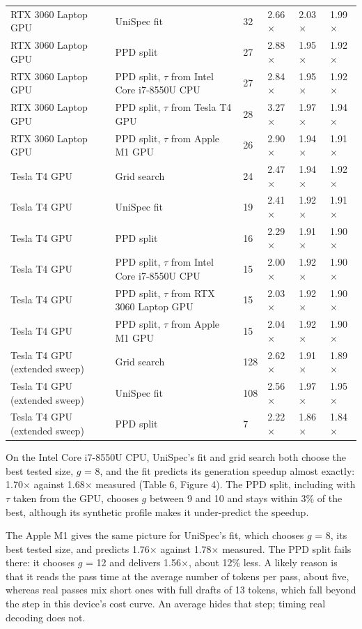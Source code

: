 \documentclass[11pt,a4paper]{article}
\begin{document}
\begin{table}[tbp]
\begin{tabular}{L{3.29cm}L{5.13cm}L{0.92cm}L{1.65cm}L{1.65cm}L{1.83cm}}
RTX 3060 Laptop GPU & UniSpec fit & 32 & 2.66$\times$ & 2.03$\times$ & 1.99$\times$ \\
RTX 3060 Laptop GPU & PPD split & 27 & 2.88$\times$ & 1.95$\times$ & 1.92$\times$ \\
RTX 3060 Laptop GPU & PPD split, $\tau$ from Intel Core i7-8550U CPU & 27 & 2.84$\times$ & 1.95$\times$ & 1.92$\times$ \\
RTX 3060 Laptop GPU & PPD split, $\tau$ from Tesla T4 GPU & 28 & 3.27$\times$ & 1.97$\times$ & 1.94$\times$ \\
RTX 3060 Laptop GPU & PPD split, $\tau$ from Apple M1 GPU & 26 & 2.90$\times$ & 1.94$\times$ & 1.91$\times$ \\
Tesla T4 GPU & Grid search & 24 & 2.47$\times$ & 1.94$\times$ & 1.92$\times$ \\
Tesla T4 GPU & UniSpec fit & 19 & 2.41$\times$ & 1.92$\times$ & 1.91$\times$ \\
Tesla T4 GPU & PPD split & 16 & 2.29$\times$ & 1.91$\times$ & 1.90$\times$ \\
Tesla T4 GPU & PPD split, $\tau$ from Intel Core i7-8550U CPU & 15 & 2.00$\times$ & 1.92$\times$ & 1.90$\times$ \\
Tesla T4 GPU & PPD split, $\tau$ from RTX 3060 Laptop GPU & 15 & 2.03$\times$ & 1.92$\times$ & 1.90$\times$ \\
Tesla T4 GPU & PPD split, $\tau$ from Apple M1 GPU & 15 & 2.04$\times$ & 1.92$\times$ & 1.90$\times$ \\
Tesla T4 GPU (extended sweep) & Grid search & 128 & 2.62$\times$ & 1.91$\times$ & 1.89$\times$ \\
Tesla T4 GPU (extended sweep) & UniSpec fit & 108 & 2.56$\times$ & 1.97$\times$ & 1.95$\times$ \\
Tesla T4 GPU (extended sweep) & PPD split & 7 & 2.22$\times$ & 1.86$\times$ & 1.84$\times$ \\
\bottomrule
\end{tabular}
\end{table}
On the Intel Core i7-8550U CPU, UniSpec's fit and grid search both choose the best tested size, $g$ = 8, and the fit predicts its generation speedup almost exactly: 1.70$\times$ against 1.68$\times$ measured (Table 6, Figure 4). The PPD split, including with $\tau$ taken from the GPU, chooses $g$ between 9 and 10 and stays within 3\% of the best, although its synthetic profile makes it under-predict the speedup.

The Apple M1 gives the same picture for UniSpec's fit, which chooses $g$ = 8, its best tested size, and predicts 1.76$\times$ against 1.78$\times$ measured. The PPD split fails there: it chooses $g$ = 12 and delivers 1.56$\times$, about 12\% less. A likely reason is that it reads the pass time at the average number of tokens per pass, about five, whereas real passes mix short ones with full drafts of 13 tokens, which fall beyond the step in this device's cost curve. An average hides that step; timing real decoding does not.
\end{document}
